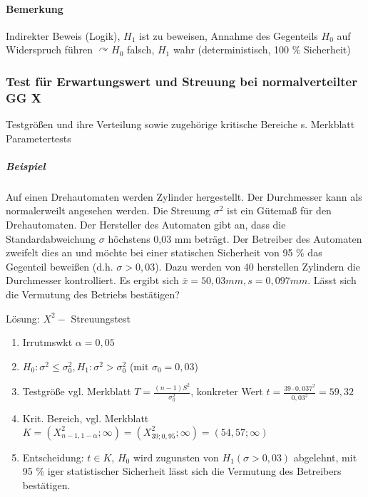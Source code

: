 \documentclass[a4paper]{scrartcl}
\begin{document}
\paragraph{Bemerkung} Indirekter Beweis (Logik), $H_1$ ist zu beweisen, Annahme des Gegenteils $H_0$ auf Widerspruch führen $\curvearrowright H_0$ falsch, $H_1$ wahr (deterministisch, 100 \% Sicherheit)

\subsubsection{Test für Erwartungswert und Streuung bei normalverteilter GG X} %
Testgrößen und ihre Verteilung sowie zugehörige kritische Bereiche s. Merkblatt Parametertests

\subparagraph{Beispiel} Auf einen Drehautomaten werden Zylinder hergestellt. Der Durchmesser kann als normalerweilt angesehen werden. Die Streuung $\sigma^2$ ist ein Gütemaß für den Drehautomaten. Der Hersteller des Automaten gibt an, dass die Standardabweichung $\sigma$ höchstens 0,03 mm beträgt. Der Betreiber des Automaten zweifelt dies an und möchte bei einer statischen Sicherheit von 95 \% das Gegenteil beweißen (d.h. $\sigma > 0,03$). Dazu werden von 40 herstellen Zylindern die Durchmesser kontrolliert. Es ergibt sich $\bar{x} = 50,03 mm, s=0,097 mm$. Lässt sich die Vermutung des Betriebs bestätigen?

Lösung: $X^2-$ Streuungstest
\begin{enumerate}
\item Irrutmswkt $\alpha = 0,05$
\item $H_0: \sigma^2 \leq \sigma_0^2, H_1 : \sigma^2 > \sigma_0^2$ (mit $\sigma_0 = 0,03$)
\item Testgröße vgl. Merkblatt $T= \frac{(n-1)S^2}{\sigma_0^2}$, konkreter Wert $t = \frac{39 \cdot 0,037^2}{0,03^2} = 59,32$
\item Krit. Bereich, vgl. Merkblatt $K= (X^2_{n-1,1-\alpha}; \infty ) = (X^2_{39;0,95};\infty) = (54,57;\infty)$
\item Entscheidung: $t \in K$, $H_0$ wird zugunsten von $H_1 (\sigma > 0,03)$ abgelehnt, mit 95 \% iger statistischer Sicherheit lässt sich die Vermutung des Betreibers bestätigen.
\end{enumerate}
\end{document}
